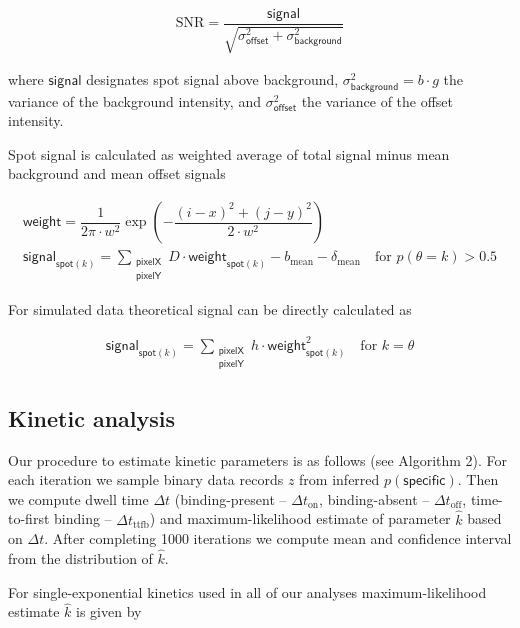 \begin{gather*}
    \mathrm{SNR} = \dfrac{\mathsf{signal}}{\sqrt{\sigma^2_{\mathsf{offset}} + \sigma^2_{\mathsf{background}}}}
\end{gather*}

where $\mathsf{signal}$ designates spot signal above background, $\sigma^2_{\mathsf{background}} = b \cdot g$ the variance of the background intensity, and $\sigma^2_{\mathsf{offset}}$ the variance of the offset intensity.

Spot signal is calculated as weighted average of total signal minus mean background and mean offset signals

\begin{gather*}
    \mathsf{weight} = \dfrac{1}{2 \pi \cdot w^2} \exp{\left( -\dfrac{(i-x)^2 + (j-y)^2}{2 \cdot w^2} \right)} \\
    \mathsf{signal}_{\mathsf{spot}(k)} =  \sum_{\substack{\mathsf{pixelX} \\ \mathsf{pixelY}}} D \cdot \mathsf{weight}_{\mathsf{spot}(k)} - b_{\mathrm{mean}} - \delta_\mathrm{mean} \quad \textrm{for } p(\theta = k) > 0.5
\end{gather*}

For simulated data theoretical signal can be directly calculated as

\begin{gather*}
    \mathsf{signal}_{\mathsf{spot}(k)} =  \sum_{\substack{\mathsf{pixelX} \\ \mathsf{pixelY}}} h \cdot \mathsf{weight}_{\mathsf{spot}(k)}^2 \quad \textrm{for } k = \theta
\end{gather*}

\subsection*{Kinetic analysis}

Our procedure to estimate kinetic parameters is as follows (see Algorithm 2). For each iteration we sample binary data records $z$ from inferred $p(\mathsf{specific})$. Then we compute dwell time $\Delta t$ (binding-present -- $\Delta t_\mathrm{on}$, binding-absent -- $\Delta t_\mathrm{off}$, time-to-first binding -- $\Delta t_\mathrm{ttfb}$) and maximum-likelihood estimate of parameter $\hat{k}$ based on $\Delta t$. After completing 1000 iterations we compute mean and confidence interval from the distribution of $\hat{k}$.

For single-exponential kinetics used in all of our analyses maximum-likelihood estimate $\hat{k}$ is given by

